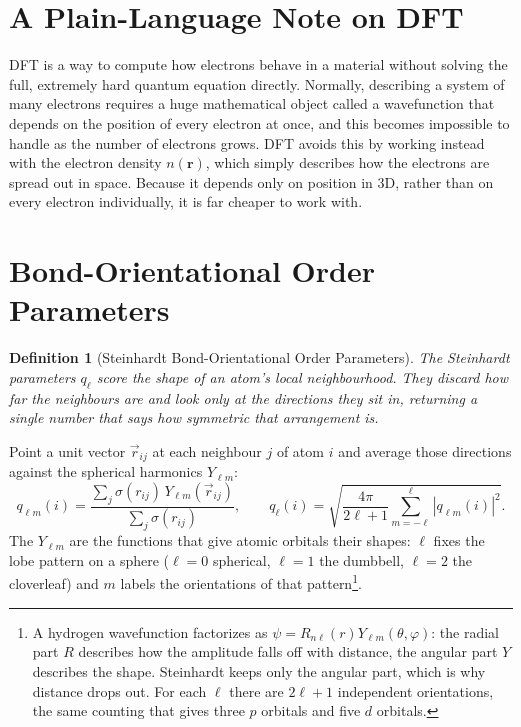 \documentclass{article}
\newtheorem{definition}{Definition}
\begin{document}
\section{A Plain-Language Note on DFT}
DFT is a way to compute how electrons behave in a material without solving the full, extremely hard quantum equation directly. Normally, describing a system of many electrons requires a huge mathematical object called a wavefunction that depends on the position of every electron at once, and this becomes impossible to handle as the number of electrons grows. DFT avoids this by working instead with the electron density $n(\mathbf{r})$, which simply describes how the electrons are spread out in space. Because it depends only on position in 3D, rather than on every electron individually, it is far cheaper to work with.

\section{Bond-Orientational Order Parameters}
\label{BOO}
\begin{definition}[Steinhardt Bond-Orientational Order Parameters]
    The Steinhardt parameters $q_\ell$ score the shape of an atom's local neighbourhood. They discard how far the neighbours are and look only at the directions they sit in, returning a single number that says how symmetric that arrangement is.
\end{definition}

Point a unit vector $\vec{r}_{ij}$ at each neighbour $j$ of atom $i$ and average those directions against the spherical harmonics $Y_{\ell m}$:
\begin{equation}
    q_{\ell m}(i) = \frac{\sum_{j}\sigma(r_{ij})\,Y_{\ell m}(\vec{r}_{ij})}{\sum_{j}\sigma(r_{ij})},
    \qquad
    q_{\ell}(i) = \sqrt{ \frac{4\pi}{2\ell + 1} \sum_{m = -\ell}^{\ell} \left| q_{\ell m}(i) \right|^{2} }.
    \label{eq:steinhardt}
\end{equation}
The $Y_{\ell m}$ are the functions that give atomic orbitals their shapes: $\ell$ fixes the lobe pattern on a sphere ($\ell = 0$ spherical, $\ell = 1$ the dumbbell, $\ell = 2$ the cloverleaf) and $m$ labels the orientations of that pattern\footnote{A hydrogen wavefunction factorizes as $\psi = R_{n\ell}(r)Y_{\ell m}(\theta,\varphi)$: the radial part $R$ describes how the amplitude falls off with distance, the angular part $Y$ describes the shape. Steinhardt keeps only the angular part, which is why distance drops out. For each $\ell$ there are $2\ell+1$ independent orientations, the same counting that gives three $p$ orbitals and five $d$ orbitals.}.
\end{document}
